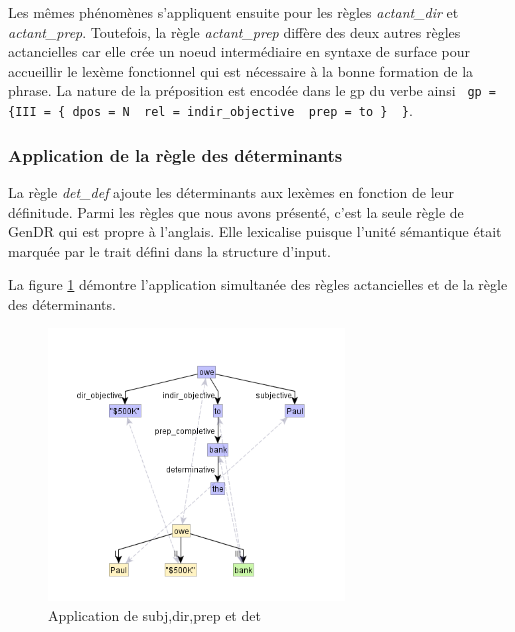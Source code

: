 Les mêmes phénomènes s'appliquent ensuite pour les règles \emph{actant\_dir} et \emph{actant\_prep}. Toutefois, la règle \emph{actant\_prep} diffère des deux autres règles actancielles car elle crée un noeud intermédiaire en syntaxe de surface pour accueillir le lexème fonctionnel  qui est nécessaire à la bonne formation de la phrase. La nature de la préposition est encodée dans le gp du verbe ainsi \lstinline! gp = {III = { dpos = N  rel = indir_objective  prep = to }  }!.

\subsubsection{Application de la règle des déterminants}

La règle \emph{det\_def} ajoute les déterminants aux lexèmes en fonction de leur définitude. Parmi les règles que nous avons présenté, c'est la seule règle de GenDR qui est propre à l'anglais. Elle lexicalise  puisque l'unité sémantique  était marquée par le trait défini dans la structure d'input.

La figure \ref{fig:syntsurf} démontre l'application simultanée des règles actancielles et de la règle des déterminants.

\begin{figure}[htb]
	\centering
	\includegraphics[width=0.7\textwidth, trim = {0cm 0cm 0cm 0cm},clip]{ch3/figs/rsynts_syntactisation.png}
	\caption{Application de subj,dir,prep et det}
	\label{fig:syntsurf}
\end{figure}



